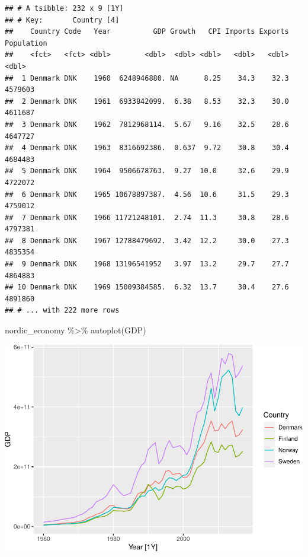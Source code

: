 \documentclass[
]{book}
\newenvironment{Shaded}{\begin{snugshade}}{\end{snugshade}}
\newcommand{\FunctionTok}[1]{\textcolor[rgb]{0.00,0.00,0.00}{#1}}
\newcommand{\NormalTok}[1]{#1}
\newcommand{\SpecialCharTok}[1]{\textcolor[rgb]{0.00,0.00,0.00}{#1}}
\begin{document}
\begin{verbatim}
## # A tsibble: 232 x 9 [1Y]
## # Key:       Country [4]
##    Country Code   Year          GDP Growth   CPI Imports Exports Population
##    <fct>   <fct> <dbl>        <dbl>  <dbl> <dbl>   <dbl>   <dbl>      <dbl>
##  1 Denmark DNK    1960  6248946880. NA      8.25    34.3    32.3    4579603
##  2 Denmark DNK    1961  6933842099.  6.38   8.53    32.3    30.0    4611687
##  3 Denmark DNK    1962  7812968114.  5.67   9.16    32.5    28.6    4647727
##  4 Denmark DNK    1963  8316692386.  0.637  9.72    30.8    30.4    4684483
##  5 Denmark DNK    1964  9506678763.  9.27  10.0     32.6    29.9    4722072
##  6 Denmark DNK    1965 10678897387.  4.56  10.6     31.5    29.3    4759012
##  7 Denmark DNK    1966 11721248101.  2.74  11.3     30.8    28.6    4797381
##  8 Denmark DNK    1967 12788479692.  3.42  12.2     30.0    27.3    4835354
##  9 Denmark DNK    1968 13196541952   3.97  13.2     29.7    27.7    4864883
## 10 Denmark DNK    1969 15009384585.  6.32  13.7     30.4    27.6    4891860
## # ... with 222 more rows
\end{verbatim}

\begin{Shaded}
\begin{Highlighting}[]
\NormalTok{nordic\_economy }\SpecialCharTok{\%\textgreater{}\%} \FunctionTok{autoplot}\NormalTok{(GDP)}
\end{Highlighting}
\end{Shaded}

\includegraphics{graphics/unnamed-chunk-74-1.pdf}
\end{document}
